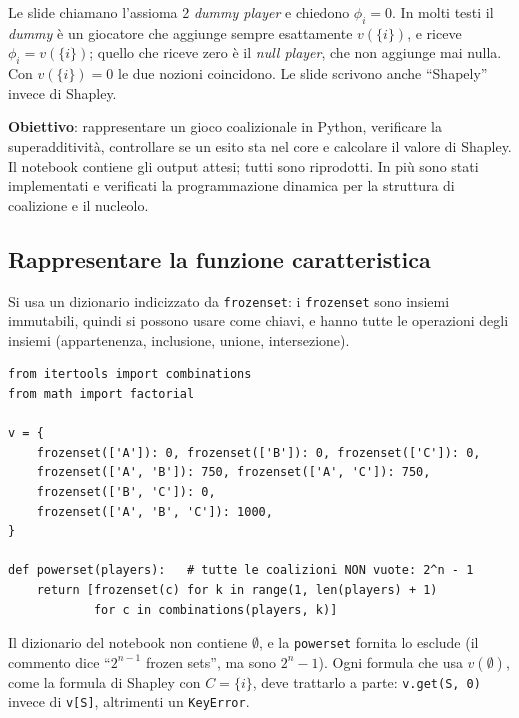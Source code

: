 \begin{attenzione}
Le slide chiamano l'assioma 2 \emph{dummy player} e chiedono $\phi_i = 0$. In molti testi
il \emph{dummy} è un giocatore che aggiunge sempre esattamente $v(\{i\})$, e riceve
$\phi_i = v(\{i\})$; quello che riceve zero è il \emph{null player}, che non aggiunge mai
nulla. Con $v(\{i\}) = 0$ le due nozioni coincidono. Le slide scrivono anche ``Shapely''
invece di Shapley.
\end{attenzione}


\textbf{Obiettivo}: rappresentare un gioco coalizionale in Python, verificare la
superadditività, controllare se un esito sta nel core e calcolare il valore di Shapley.
Il notebook contiene gli output attesi; tutti sono riprodotti. In più sono stati implementati
e verificati la programmazione dinamica per la struttura di coalizione e il nucleolo.

\subsection{Rappresentare la funzione caratteristica}

Si usa un dizionario indicizzato da \texttt{frozenset}: i \texttt{frozenset} sono insiemi
immutabili, quindi si possono usare come chiavi, e hanno tutte le operazioni degli insiemi
(appartenenza, inclusione, unione, intersezione).

\begin{lstlisting}
from itertools import combinations
from math import factorial

v = {
    frozenset(['A']): 0, frozenset(['B']): 0, frozenset(['C']): 0,
    frozenset(['A', 'B']): 750, frozenset(['A', 'C']): 750,
    frozenset(['B', 'C']): 0,
    frozenset(['A', 'B', 'C']): 1000,
}

def powerset(players):   # tutte le coalizioni NON vuote: 2^n - 1
    return [frozenset(c) for k in range(1, len(players) + 1)
            for c in combinations(players, k)]
\end{lstlisting}

\begin{attenzione}
Il dizionario del notebook non contiene $\emptyset$, e la \texttt{powerset} fornita lo
esclude (il commento dice ``$2^{n-1}$ frozen sets'', ma sono $2^n - 1$). Ogni formula che
usa $v(\emptyset)$, come la formula di Shapley con $C = \{i\}$, deve trattarlo a parte:
\texttt{v.get(S, 0)} invece di \texttt{v[S]}, altrimenti un \texttt{KeyError}.
\end{attenzione}

